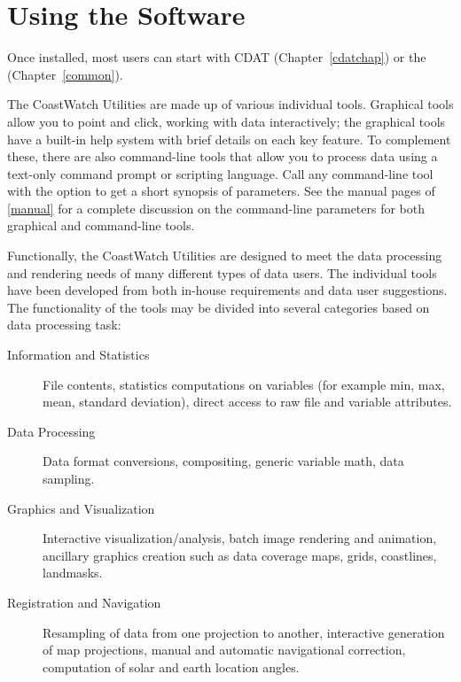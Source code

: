 \section{Using the Software}

Once installed, most users can start with CDAT (Chapter~\ref*{cdatchap}) or 
the  (Chapter~\ref*{common}).

The CoastWatch Utilities are made up of various individual tools.
Graphical tools allow you to point and click, working with data
interactively; the graphical tools have a built-in help system
with brief details on each key feature.  To complement these,
there are also command-line tools that allow you to process data
using a text-only command prompt or scripting language.  Call any
command-line tool with the  option to get a
short synopsis of parameters.  See the manual pages of
\autoref{manual} for a complete discussion on the command-line
parameters for both graphical and command-line tools.

Functionally, the CoastWatch Utilities are designed to meet the data
processing and rendering needs of many different types of data users.
The individual tools have been developed from both in-house
requirements and data user suggestions.  The functionality of the
tools may be divided into several categories based on data processing
task:
\begin{description}

  \item[Information and Statistics] File contents, statistics
  computations on variables (for example min, max, mean, standard
  deviation), direct access to raw file and variable attributes.

  \item[Data Processing] Data format conversions,
  compositing, generic variable math, data sampling.

  \item[Graphics and Visualization] Interactive
  visualization/analysis, batch image rendering and animation, ancillary graphics
  creation such as data coverage maps, grids, coastlines, landmasks.
    
  \item[Registration and Navigation] Resampling of data from one
  projection to another, interactive generation of map projections,
  manual and automatic navigational correction, computation of solar
  and earth location angles.

\end{description}

